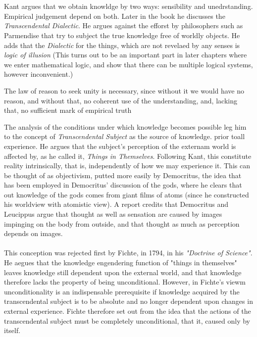 \documentclass[10pt,a4paper]{article}
\begin{document}
                    \\
                    \\
                    Kant argues that we obtain knowldge by two ways: sensibility and unedrstanding. Empirical judgement depend on both. Later in the book he discusses the \textit{Transcendental Dialectic}. He argues against the efforst by philosophers such as Parmendise that try to subject the true knowledge free of worldly objects. He adds that the \textit{Dialectic} for the things, which are not revelaed by any senses is \textit{logic of illusion} (This turns out to be an important part in later chapters where we enter mathematical logic, and show that there can be multiple logical systems, however inconvenient.)\cite{sep-kant-reason}
                    \begin{qt}
                        The law of reason to seek unity is necessary, since without it we would have no reason, and without that, no coherent use of the understanding, and, lacking that, no sufficient mark of empirical truth
                    \end{qt}
                    The analysis of the conditions under which knowledge becomes possible leg him to the concept of \textit{Transcendental Subject} as the source of knowledge. prior toall experience. He argues that the subject's perception of the externam world is affected by, as he called it, \textit{Things in Themselves}. Following Kant, this constitute reality intrinsically, that is, independently of how we may experience it. This can be thought of as objectivism, putted more easily by Democritus, the idea that has been employed in Democritus' discussion of the gods, where he clears that out knowledge of the gods comes from giant films of atoms (since he constructed his worldview with atomistic view). A report credits that Democritus and Leucippus argue that thought as well as sensation are caused by images impinging on the body from outside, and that thought as much as perception depends on images.\cite{Cartledge1998-CARDTG-3}\cite{sep-democritus}\cite{Graham2010-th}
                    \\
                    \\
                    This conception was rejected first by Fichte, in 1794, in his \textit{"Doctrine of Science"}. He aegues that the knowledge engendering function of "things in themselves" leaves knowledge still dependent upon the external world, and that knowledge therefore lacks the property of being unconditional. However, in Fichte's viewm unconditionality is an indispensable prerequisite if knowledge acquired by the transcendental subject is to be absolute and no longer dependent upon changes in external experience. Fichte therefore set out from the idea that the actions of the transcendental subject must be completely unconditional, that it, caused only by itself.
\end{document}
